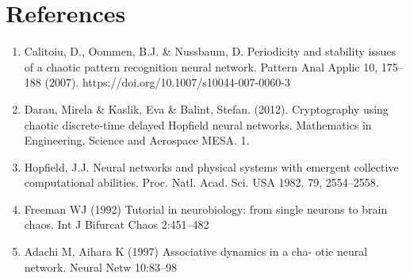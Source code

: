 \documentclass[12pt, letterpaper]{article}
\begin{document}
\section*{References}

\fontsize{8}{12}\selectfont

\begin{enumerate}[leftmargin=*]
    \item Calitoiu, D., Oommen, B.J. \& Nussbaum, D. Periodicity and stability issues of a chaotic pattern recognition neural network. Pattern Anal Applic 10, 175–188 (2007). https://doi.org/10.1007/s10044-007-0060-3
    \item Darau, Mirela \& Kaslik, Eva \& Balint, Stefan. (2012). Cryptography using chaotic discrete-time delayed Hopfield neural networks. Mathematics in Engineering, Science and Aerospace MESA. 1.
    \item Hopfield, J.J. Neural networks and physical systems with emergent collective computational abilities.
    Proc. Natl. Acad. Sci. USA 1982. 79, 2554–2558.
    \item Freeman WJ (1992) Tutorial in neurobiology: from single neurons to brain chaos. Int J Bifurcat Chaos 2:451–482
    \item Adachi M, Aihara K (1997) Associative dynamics in a cha- otic neural network. Neural Netw 10:83–98
\end{enumerate}
\end{document}
